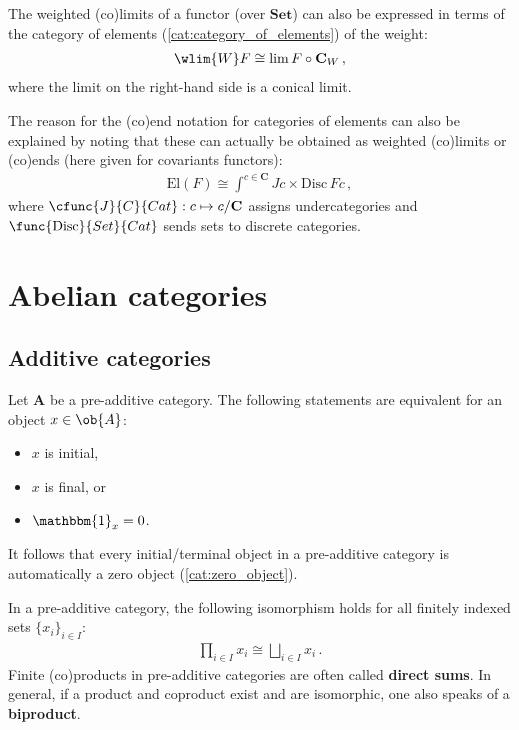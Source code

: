     \begin{property}
        The weighted (co)limits of a functor (over $\mathbf{Set}$) can also be expressed in terms of the category of elements (\cref{cat:category_of_elements}) of the weight:
        \begin{gather}
            \wlim{W}F\cong\lim F\circ\mathbf{C}_W\,,
        \end{gather}
        where the limit on the right-hand side is a conical limit.

        The reason for the (co)end notation for categories of elements can also be explained by noting that these can actually be obtained as weighted (co)limits or (co)ends (here given for covariants functors):
        \begin{gather}
            \mathrm{El}(F) \cong \int^{c\in\mathbf{C}}Jc\times\mathrm{Disc}\,Fc\,,
        \end{gather}
        where $\cfunc{J}{C}{Cat}:c\mapsto c/\mathbf{C}$ assigns undercategories and $\func{\mathrm{Disc}}{Set}{Cat}$ sends sets to discrete categories.
    \end{property}

\section{Abelian categories}\label{section:abelian_categories}
\subsection{Additive categories}


    \begin{property}
        Let $\mathbf{A}$ be a pre-additive category. The following statements are equivalent for an object $x\in\ob{A}$:
        \begin{itemize}
            \item $x$ is initial,
            \item $x$ is final, or
            \item $\mathbbm{1}_x = 0$.
        \end{itemize}
        It follows that every initial/terminal object in a pre-additive category is automatically a zero object (\cref{cat:zero_object}).
    \end{property}
    \begin{property}[Biproducts]
        In a pre-additive category, the following isomorphism holds for all finitely indexed sets $\{x_i\}_{i\in I}$:
        \begin{gather}
            \prod_{i\in I}x_i\cong\bigsqcup_{i\in I}x_i\,.
        \end{gather}
        Finite (co)products in pre-additive categories are often called \textbf{direct sums}. In general, if a product and coproduct exist and are isomorphic, one also speaks of a \textbf{biproduct}.
    \end{property}

